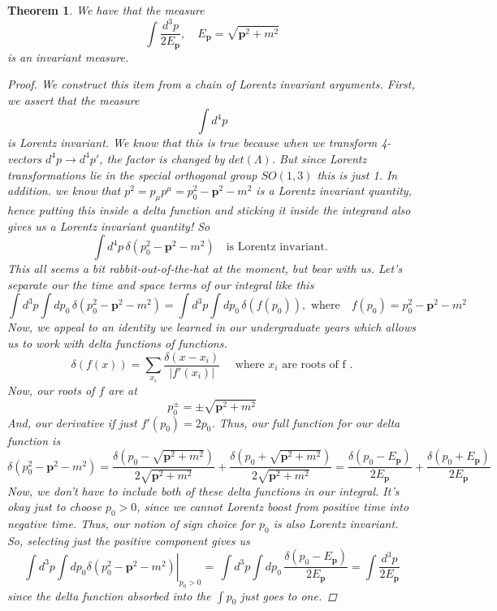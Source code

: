 \documentclass[11pt, oneside]{article}   	%
\theoremstyle{newline}
\theoremstyle{newline}
\newtheorem*{thm}{Theorem}
\theoremstyle{newline}
\theoremstyle{newline}
\theoremstyle{newline}
\newcommand{\ve}[1]{ \mathbf{ #1 } }
\newcommand{\arr}{\rightarrow}
\begin{document}
\begin{thm} 
We have that the measure 
\[ 	
\int \frac{ d^3 p}{2 E_\ve{ p } } , \quad E_\ve{ p } = \sqrt { \ve{ p}^2 + m^2 } 
\] is an invariant measure.

\begin{proof}
We construct this item from a chain of Lorentz invariant arguments. First, we assert that the measure 
\[
\int d^4 p 
\] is Lorentz invariant. We know that this is true because when we transform 4-vectors $d^4 p \arr d^4 p'$, the factor is changed by $det ( \Lambda) $. But since Lorentz transformations lie in the special orthogonal group $SO(1, 3)$ this is just 1. In addition. we know that $p^2  = p_\mu p^\mu = p_0^2 - \ve{ p}^2 - m^2 $ is a Lorentz invariant quantity, hence putting this inside a delta function and sticking it inside the integrand also gives us a Lorentz invariant quantity!
So 
\[ 	
\int d^4p \,  \delta \left( p_0^2  - \ve{ p}^2 - m^2 \right) \quad \text{is Lorentz invariant. } 
\] This all seems a bit rabbit-out-of-the-hat at the moment, but bear with us. Let's separate our the time and space terms of our integral like this 
\[
\int d^3 p \int dp_0 \, \delta \left( p_0^2 - \ve{ p}^2  - m^2 \right)  = \int d^3 p \int dp_0 \,  \delta \left( f (p_0 )\right) , \text{ where}  \quad f( p_0) = p_0^2  - \ve{ p} ^2  - m^2 
\] Now, we appeal to an identity we learned in our undergraduate years which allows us to work with delta functions of functions. 
\[	
\delta ( f ( x) )  = \sum_{ x_i } \frac{  \delta ( x - x_i)}{ | f'( x_i) |} \quad \text{ where } x_i \text{ are roots of f }.
\] Now, our roots of $ f$ are at 
\[ 
p_0^{ \pm}  = \pm \sqrt{ \ve{ p }^2 + m^2 } 
\] And, our derivative if just $f' ( p_0 )  = 2 p_0 $. Thus, our full function for our delta function is 
\[	
\delta \left( p_0^2 - \ve{ p}^2  - m^2 \right) = \frac{ \delta ( p_0  -  \sqrt{ \ve{ p }^2 + m^2 }  )}{ 2 \sqrt{ \ve{ p }^2 + m^2 } } +  \frac{ \delta ( p_0  +\sqrt{ \ve{ p }^2 + m^2 }  )}{  2\sqrt{ \ve{ p }^2 + m^2 } } = \frac{ \delta ( p_0  -  E_\ve{ p} )}{ 2 E_\ve{ p}  } +  \frac{ \delta ( p_0  + E_\ve{ p}  )}{  2 E_\ve{ p }  } 
\] Now, we don't have to include both of these delta functions in our integral. It's okay just to choose $p_0 > 0 $, since we cannot Lorentz boost from positive time into negative time. Thus, our notion of sign choice for $p_0$ is also Lorentz invariant. So, selecting just the positive component 
gives us 
\[ 
\int d^3 p \left. \int dp_0 \delta \left( p_0^2 - \ve{ p}^2  - m^2 \right) \right\vert_{p_0 > 0 }  = \,\int d^3 p  \int d p_0 \, \frac{ \delta ( p_0  -  E_\ve{ p} )}{ 2 E_\ve{ p}  } = \int \frac{ d^3 p }{ 2 E_ \ve{ p} } 
\] since the delta function absorbed into the $\int p_0$ just goes to one. 
\end{proof}
\end{thm}  
\end{document}
